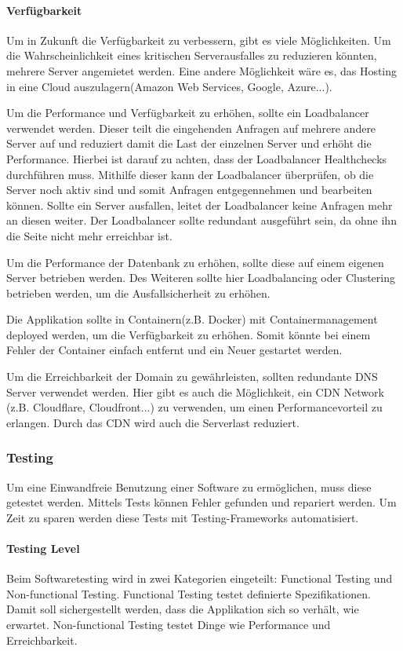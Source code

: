 \paragraph{Verfügbarkeit}
Um in Zukunft die Verfügbarkeit zu verbessern, gibt es viele Möglichkeiten. Um die Wahrscheinlichkeit eines kritischen Serverausfalles zu reduzieren könnten, mehrere Server angemietet werden. Eine andere Möglichkeit wäre es, das Hosting in eine Cloud auszulagern(Amazon Web Services, Google, Azure...). 

Um die Performance und Verfügbarkeit zu erhöhen, sollte ein Loadbalancer verwendet werden. Dieser teilt die eingehenden Anfragen auf mehrere andere Server auf und reduziert damit die Last der einzelnen Server und erhöht die Performance. Hierbei ist darauf zu achten, dass der Loadbalancer Healthchecks durchführen muss. Mithilfe dieser kann der Loadbalancer überprüfen, ob die Server noch aktiv sind und somit Anfragen entgegennehmen und bearbeiten können. Sollte ein Server ausfallen, leitet der Loadbalancer keine Anfragen mehr an diesen weiter. Der Loadbalancer sollte redundant ausgeführt sein, da ohne ihn die Seite nicht mehr erreichbar ist. 

Um die Performance der Datenbank zu erhöhen, sollte diese auf einem eigenen Server betrieben werden. Des Weiteren sollte hier Loadbalancing oder Clustering betrieben werden, um die Ausfallsicherheit zu erhöhen. 

Die Applikation sollte in Containern(z.B. Docker) mit Containermanagement deployed werden, um die Verfügbarkeit zu erhöhen. Somit könnte bei einem Fehler der Container einfach entfernt und ein Neuer gestartet werden. 

Um die Erreichbarkeit der Domain zu gewährleisten, sollten redundante DNS Server verwendet werden. Hier gibt es auch die Möglichkeit, ein CDN Network (z.B. Cloudflare, Cloudfront...) zu verwenden, um einen Performancevorteil zu erlangen. Durch das CDN wird auch die Serverlast reduziert.

\newpage

\subsubsection{Testing}
Um eine Einwandfreie Benutzung einer Software zu ermöglichen, muss diese getestet werden. Mittels Tests können Fehler gefunden und repariert werden. Um Zeit zu sparen werden diese Tests mit Testing-Frameworks automatisiert.

\paragraph{Testing Level}
Beim Softwaretesting wird in zwei Kategorien eingeteilt: Functional Testing und Non-functional Testing. Functional Testing testet definierte Spezifikationen. Damit soll sichergestellt werden, dass die Applikation sich so verhält, wie erwartet. Non-functional Testing testet Dinge wie Performance und Erreichbarkeit.\cite{TESTING1}

